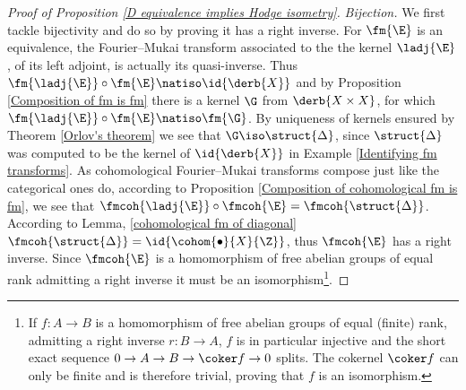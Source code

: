 \begin{proof}[Proof of Proposition \ref{D equivalence implies Hodge isometry}]
    \vspace{0.3 cm}
    \noindent
    \textsl{Bijection.}
    We first tackle bijectivity
    and do so by proving it has a right inverse. For $\fm{\E}$ is an equivalence, the Fourier--Mukai transform associated to the the kernel $\ladj{\E}$, of its left adjoint, is actually its quasi-inverse. Thus $\fm{\ladj{\E}} \circ \fm{\E} \natiso \id{\derb{X}}$ and by Proposition \ref{Composition of fm is fm} there is a kernel $\G$ from $\derb{X \times X}$, for which $\fm{\ladj{\E}} \circ \fm{\E} \natiso \fm{\G}$. By uniqueness of kernels ensured by Theorem \ref{Orlov's theorem} we see that $\G \iso \struct{\Delta}$, since $\struct{\Delta}$ was computed to be the kernel of $\id{\derb{X}}$ in Example \ref{Identifying fm transforms}. As cohomological Fourier--Mukai transforms compose just like the categorical ones do, according to Proposition \ref{Composition of cohomological fm is fm}, we see that $\fmcoh{\ladj{\E}} \circ \fmcoh{\E} = \fmcoh{\struct{\Delta}}$. According to Lemma, \ref{cohomological fm of diagonal} $\fmcoh{\struct{\Delta}} = \id{\cohom{\bullet}{X}{\Z}}$, thus $\fmcoh{\E}$ has a right inverse. Since $\fmcoh{\E}$ is a homomorphism of free abelian groups of equal rank admitting a right inverse it must be an isomorphism\footnote{
        If $f \colon A \to B$ is a homomorphism of free abelian groups of equal (finite) rank, admitting a right inverse $r \colon B \to A$, $f$ is in particular injective and the short exact sequence $0 \to A \to B \to \coker f \to 0$ splits. The cokernel $\coker f$ can only be finite and is therefore trivial, proving that $f$ is an isomorphism.
    }.
    
    
    

\end{proof}
